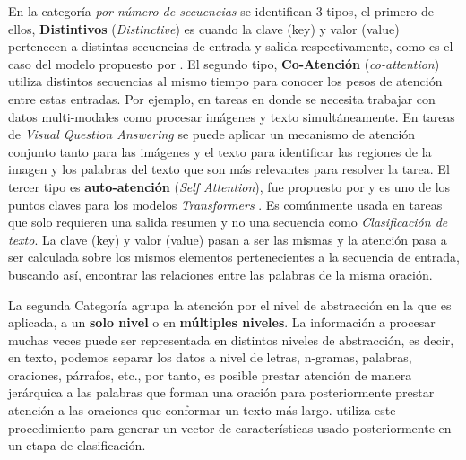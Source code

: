 En la categoría \textit{por número de secuencias} se identifican 3 tipos, el primero de ellos,
\textbf{Distintivos} (\textit{Distinctive}) es cuando la clave (key) y valor (value) pertenecen a
distintas secuencias de entrada y salida respectivamente, como es el caso del modelo propuesto por
\citeauthor*{bahdanau2016neural}. El segundo tipo, \textbf{Co-Atención} (\textit{co-attention}) utiliza
distintos secuencias al mismo tiempo para conocer los pesos de atención entre estas entradas. Por ejemplo,
en tareas en donde se necesita trabajar con datos multi-modales como procesar imágenes y texto
simultáneamente. En tareas de \textit{Visual Question Answering}
se puede aplicar un mecanismo de atención conjunto tanto para las imágenes y el texto para identificar
las regiones de la imagen y los palabras del texto que son más relevantes para resolver la tarea. El
tercer tipo es \textbf{auto-atención} (\textit{Self Attention}), fue propuesto por \citeauthor{yang2016hierarchical} y es uno
de los puntos claves para los modelos \textit{Transformers} \cite{DBLP:journals/corr/VaswaniSPUJGKP17}.
Es comúnmente usada en tareas que solo requieren una salida resumen y no una secuencia como \textit{
Clasificación de texto}. La clave (key) y valor (value) pasan a ser las mismas y la atención pasa
a ser calculada sobre los mismos elementos pertenecientes a la secuencia de entrada, buscando
así, encontrar las relaciones entre las palabras de la misma oración.

La segunda Categoría agrupa la atención por el nivel de abstracción en la que es aplicada, a un
\textbf{solo nivel} o en \textbf{múltiples niveles}. La información a procesar muchas veces puede ser
representada en distintos niveles de abstracción, es decir, en texto, podemos separar los datos a
nivel de letras, n-gramas, palabras, oraciones, párrafos, etc., por tanto, es posible prestar atención
de manera jerárquica a las palabras que forman una oración para posteriormente prestar atención a
las oraciones que conformar un texto más largo. \citeauthor{yang2016hierarchical} utiliza este procedimiento
para generar un vector de características usado posteriormente en un etapa de clasificación.

